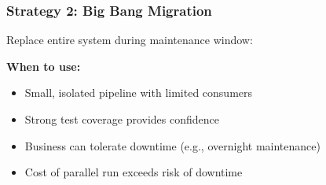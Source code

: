 \subsubsection{Strategy 2: Big Bang Migration}

Replace entire system during maintenance window:

\textbf{When to use:}
\begin{itemize}
    \item Small, isolated pipeline with limited consumers
    \item Strong test coverage provides confidence
    \item Business can tolerate downtime (e.g., overnight maintenance)
    \item Cost of parallel run exceeds risk of downtime
\end{itemize}

